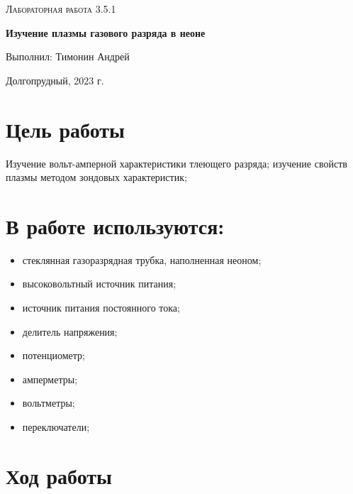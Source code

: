 \documentclass[a4paper]{article}
\begin{document}
\begin{titlepage}
	\centering
	\vspace{5cm}
	\vspace{4cm}
	{\scshape\Large Лабораторная работа 3.5.1\par}
	\vspace{1cm}
	{\huge\bfseries Изучение плазмы газового разряда в неоне\par}
	\vspace{1cm}
	\vfill
\begin{flushright}
	\vspace{0.3cm}
	{\LARGE Выполнил: Тимонин Андрей}
\end{flushright}
	

	\vfill

	Долгопрудный, 2023 г.
\end{titlepage}

\section{Цель работы}

Изучение вольт-амперной характеристики тлеющего разряда; изучение свойств плазмы методом зондовых характеристик;

\section{В работе используются:}
\begin{itemize}
    \item стеклянная газоразрядная трубка, наполненная неоном;
    \item высоковольтный источник питания;
    \item источник питания постоянного тока;
    \item делитель напряжения;
    \item потенциометр;
    \item амперметры;
    \item вольтметры;
    \item переключатели;
\end{itemize}

\section{Ход работы}
\end{document}
